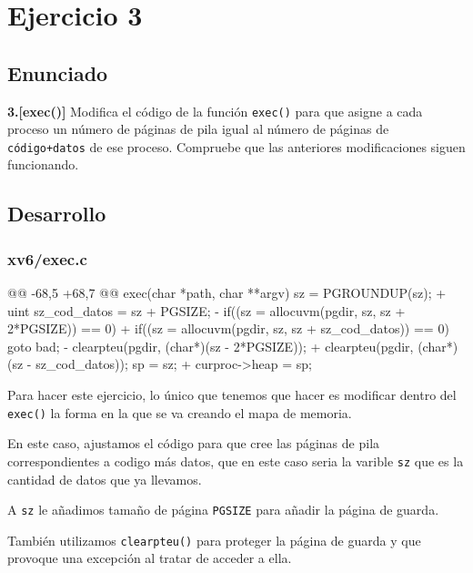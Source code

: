\section{Ejercicio 3}

\subsection{Enunciado}
\begin{ejer}
    \textbf{3.[exec()]} Modifica el código de la función \texttt{exec()} para que asigne 
    a cada proceso un número de páginas de pila igual al número de páginas de \texttt{código+datos} 
    de ese proceso. Compruebe que las anteriores modificaciones siguen funcionando.
\end{ejer}

\subsection{Desarrollo}

\subsubsection{xv6/exec.c}
\begin{listing}
@@ -68,5 +68,7 @@ exec(char *path, char **argv)
    sz = PGROUNDUP(sz);
+   uint sz_cod_datos = sz + PGSIZE;
-   if((sz = allocuvm(pgdir, sz, sz + 2*PGSIZE)) == 0)    
+   if((sz = allocuvm(pgdir, sz, sz + sz_cod_datos)) == 0)
        goto bad;
-   clearpteu(pgdir, (char*)(sz - 2*PGSIZE));
+   clearpteu(pgdir, (char*)(sz - sz_cod_datos));
    sp = sz;
+   curproc->heap = sp;
\end{listing}

\par Para hacer este ejercicio, lo único que tenemos que hacer es modificar
dentro del \texttt{exec()} la forma en la que se va creando el mapa de memoria.
\par En este caso, ajustamos el código para que cree las páginas de pila correspondientes
a codigo más datos, que en este caso seria la varible \texttt{sz} que es la cantidad de datos que ya llevamos.
\par A \texttt{sz} le añadimos tamaño de página \texttt{PGSIZE} para añadir la página de guarda.
\par También utilizamos \texttt{clearpteu()} para proteger la página de guarda y que provoque
una excepción al tratar de acceder a ella.

